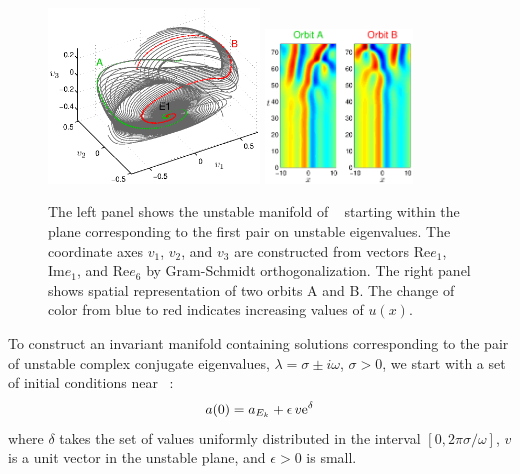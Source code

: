 \begin{figure}[t]
\begin{center}
\includegraphics[width=0.5\textwidth]{figs/ks22_E1_plane1_manifold.eps}
\includegraphics[width=0.35\textwidth]{figs/ks22_E1_plane1_orbits.eps}
\end{center}
\caption{
The left panel shows the unstable
manifold of \eqv\  starting within the plane
corresponding to the first pair on unstable eigenvalues. The
coordinate axes $v_1$, $v_2$, and $v_3$ are constructed from vectors
$\mathrm{Re} e_1$, $\mathrm{Im} e_1$, and $\mathrm{Re} e_6$
by Gram-Schmidt orthogonalization.
The right panel shows spatial representation of two orbits A and B.
The change of color from blue to red indicates increasing values of
$u(x)$.}
\label{f:KS22E1man1}
\end{figure}

To construct an invariant manifold containing solutions
corresponding to the pair of unstable complex conjugate eigenvalues,
$\lambda = \sigma\pm i\omega$, $\sigma > 0$, we start with a set of
initial conditions near \eqv\ :
\[ a(0) = a_{{E_{k}}} + \epsilon\,v\mathrm{e}^{\delta}\]
where $\delta$ takes the set of values uniformly distributed in the
interval $[0,2\pi\sigma/\omega]$, $v$ is a unit vector in the
unstable plane, and $\epsilon > 0$ is small.

